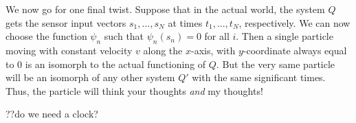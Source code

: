 We now go for one final twist. Suppose that in the actual world, the
system $Q$ gets the sensor input vectors $s_1,...,s_N$ at times $t_1,...,t_N$, respectively. We can now choose the 
function $\psi_n$ such that $\psi_n(s_n)=0$ for all $i$. Then a single particle moving with constant velocity 
$v$ along the $x$-axis, with $y$-coordinate always equal to $0$ is an isomorph to the actual functioning of $Q$.
But the very same particle will be an isomorph of any other system $Q'$ with the same significant times. Thus,
the particle will think your thoughts \textit{and} my thoughts!

??do we need a clock?

\chaptertail 


